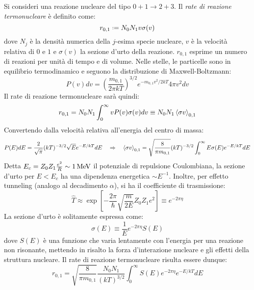Si consideri una reazione nucleare del tipo $ 0 + 1 \rightarrow 2 + 3 $. Il \textit{rate di reazione termonucleare} è definito come:
\begin{equation}
	r_{0,1} \defeq N_0 N_1 v \sigma(v)
	\label{eq:11.1}
\end{equation}
dove $ N_j $ è la densità numerica della $ j $-esima specie nucleare, $ v $ è la velocità relativa di $ 0 $ e $ 1 $ e $ \sigma(v) $ la sezione d'urto della reazione. $ r_{0,1} $ esprime un numero di reazioni per unità di tempo e di volume. Nelle stelle, le particelle sono in equilibrio termodinamico e seguono la distribuzione di Maxwell-Boltzmann:
\begin{equation}
	P(v) dv = \left( \frac{m_{0,1}}{2\pi k T} \right)^{3/2} e^{-m_{0,1} v^2 / 2kT} 4\pi v^2 dv
	\label{eq:11.2}
\end{equation}
Il rate di reazione termonucleare sarà quindi:
\begin{equation}
	r_{0,1} = N_0 N_1 \int_0^\infty v P(v) \sigma(v) dv \equiv N_0 N_1 \braket{\sigma v}_{0,1}
	\label{eq:11.3}
\end{equation}
Convertendo dalla velocità relativa all'energia del centro di massa:
\begin{equation*}
	P(E) dE = \frac{2}{\sqrt{\pi}} (kT)^{-3/2} \sqrt{E} e^{-E / kT} dE
	\quad \Rightarrow \quad
	\braket{\sigma v}_{0,1} = \sqrt{\frac{8}{\pi m_{0,1}}} (kT)^{-3/2} \int_0^\infty E \sigma(E) e^{-E / kT} dE
\end{equation*}
Detta $ E_c = Z_0 Z_1 \frac{e^2}{R} \sim 1 \,\mathrm{MeV} $ il potenziale di repulsione Coulombiana, la sezione d'urto per $ E < E_c $ ha una dipendenza energetica $ \sim E^{-1} $. Inoltre, per effetto tunneling (analogo al decadimento $ \alpha $), si ha il coefficiente di trasmissione:
\begin{equation}
	\hat{T} \approx \exp \left[ - \frac{2\pi}{\hbar} \sqrt{\frac{m}{2E}} Z_0 Z_1 e^2 \right] \equiv e^{-2\pi \eta}
	\label{eq:11.4}
\end{equation}
La sezione d'urto è solitamente espressa come:
\begin{equation}
	\sigma(E) \equiv \frac{1}{E} e^{-2\pi \eta} S(E)
	\label{eq:11.5}
\end{equation}
dove $ S(E) $ è una funzione che varia lentamente con l'energia per una reazione non risonante, mettendo in risalto la forza d'interazione nucleare e gli effetti della struttura nucleare. Il rate di reazione termonucleare risulta essere dunque:
\begin{equation}
	r_{0,1} = \sqrt{\frac{8}{\pi m_{0,1}}} \frac{N_0 N_1}{(kT)^{3/2}} \int_0^\infty S(E) e^{-2\pi \eta} e^{-E/kT} dE
	\label{eq:11.6}
\end{equation}

